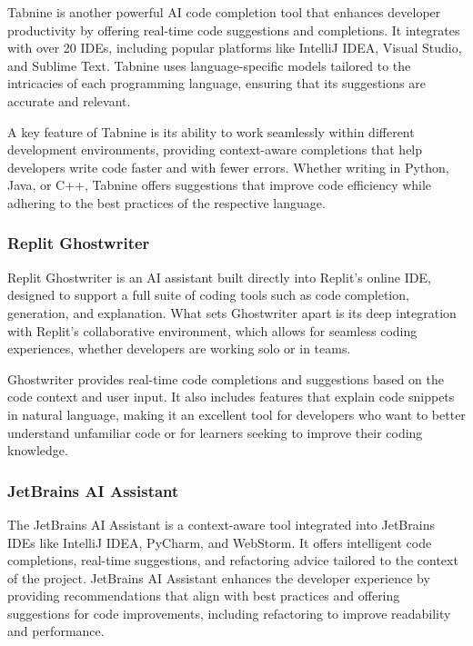 Tabnine is another powerful AI code completion tool that enhances developer productivity by offering real-time code suggestions and completions. It integrates with over 20 IDEs, including popular platforms like IntelliJ IDEA, Visual Studio, and Sublime Text. Tabnine uses language-specific models tailored to the intricacies of each programming language, ensuring that its suggestions are accurate and relevant.

A key feature of Tabnine is its ability to work seamlessly within different development environments, providing context-aware completions that help developers write code faster and with fewer errors. Whether writing in Python, Java, or C++, Tabnine offers suggestions that improve code efficiency while adhering to the best practices of the respective language.

\subsubsection{Replit Ghostwriter}

Replit Ghostwriter is an AI assistant built directly into Replit's online IDE, designed to support a full suite of coding tools such as code completion, generation, and explanation. What sets Ghostwriter apart is its deep integration with Replit's collaborative environment, which allows for seamless coding experiences, whether developers are working solo or in teams.

Ghostwriter provides real-time code completions and suggestions based on the code context and user input. It also includes features that explain code snippets in natural language, making it an excellent tool for developers who want to better understand unfamiliar code or for learners seeking to improve their coding knowledge.

\subsubsection{JetBrains AI Assistant}

The JetBrains AI Assistant is a context-aware tool integrated into JetBrains IDEs like IntelliJ IDEA, PyCharm, and WebStorm. It offers intelligent code completions, real-time suggestions, and refactoring advice tailored to the context of the project. JetBrains AI Assistant enhances the developer experience by providing recommendations that align with best practices and offering suggestions for code improvements, including refactoring to improve readability and performance.

